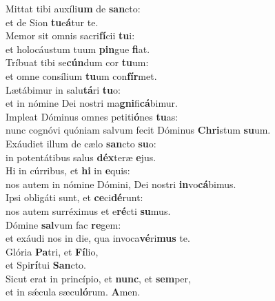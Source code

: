 \evenverse Mittat tibi auxíli\textbf{um} de \textbf{san}cto:~\*\\
\evenverse et de Sion \textbf{tu}e\textbf{á}tur te.\\
\oddverse Memor sit omnis sacri\textbf{fí}cii \textbf{tu}i:~\*\\
\oddverse et holocáustum tuum \textbf{pin}gue \textbf{fi}at.\\
\evenverse Tríbuat tibi se\textbf{cún}dum cor \textbf{tu}um:~\*\\
\evenverse et omne consílium \textbf{tu}um con\textbf{fír}met.\\
\oddverse Lætábimur in salu\textbf{tá}ri \textbf{tu}o:~\*\\
\oddverse et in nómine Dei nostri ma\textbf{gni}fi\textbf{cá}bimur.\\
\evenverse Impleat Dóminus omnes petiti\textbf{ó}nes \textbf{tu}as:~\*\\
\evenverse nunc cognóvi quóniam salvum fecit Dóminus \textbf{Chri}stum \textbf{su}um.\\
\oddverse Exáudiet illum de cælo \textbf{san}cto \textbf{su}o:~\*\\
\oddverse in potentátibus salus \textbf{déx}teræ \textbf{e}jus.\\
\evenverse Hi in cúrribus, et \textbf{hi} in \textbf{e}quis:~\*\\
\evenverse nos autem in nómine Dómini, Dei nostri \textbf{in}vo\textbf{cá}bimus.\\
\oddverse Ipsi obligáti sunt, et \textbf{ce}ci\textbf{dé}runt:~\*\\
\oddverse nos autem surréximus et e\textbf{ré}cti \textbf{su}mus.\\
\evenverse Dómine \textbf{sal}vum fac \textbf{re}gem:~\*\\
\evenverse et exáudi nos in die, qua invoca\textbf{vé}ri\textbf{mus} te.\\
\oddverse Glória \textbf{Pa}tri, et \textbf{Fí}lio,~\*\\
\oddverse et Spi\textbf{rí}tui \textbf{San}cto.\\
\evenverse Sicut erat in princípio, et \textbf{nunc}, et \textbf{sem}per,~\*\\
\evenverse et in sǽcula sæcu\textbf{ló}rum. \textbf{A}men.\\
